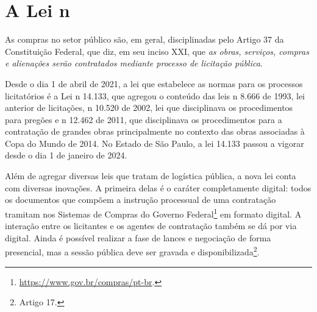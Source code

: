 

\chapter{A Lei n}
\label{cap:14133}

As compras no setor público são, em geral, disciplinadas pelo Artigo 37 da Constituição Federal, que diz, em seu inciso XXI, que \emph{as obras, serviços, compras e alienações serão contratados mediante processo de licitação pública}.

Desde o dia 1{\textordmasculine} de abril de 2021, a lei que estabelece as normas para os processos licitatórios é a Lei n{\textordmasculine} 14.133, que agregou o conteúdo das leis n{\textordmasculine} 8.666 de 1993, lei anterior de licitações, n{\textordmasculine} 10.520 de 2002, lei que disciplinava os procedimentos para pregões e n{\textordmasculine} 12.462 de 2011, que disciplinava os procedimentos para a contratação de grandes obras principalmente no contexto das obras associadas à Copa do Mundo de 2014. No Estado de São Paulo, a lei 14.133 passou a vigorar desde o dia 1{\textordmasculine} de janeiro de 2024.

Além de agregar diversas leis que tratam de logística pública, a nova lei conta com diversas inovações. A primeira delas é o caráter completamente digital: todos os documentos que compõem a instrução processual de uma contratação tramitam nos Sistemas de Compras do Governo Federal\footnote{\url{https://www.gov.br/compras/pt-br}.} em formato digital. A interação entre os licitantes e os agentes de contratação também se dá por via digital. Ainda é possível realizar a fase de lances e negociação de forma presencial, mas a sessão pública deve ser gravada e disponibilizada\footnote{Artigo 17.}.

